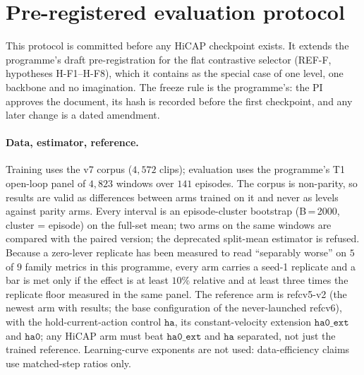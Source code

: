 \section{Pre-registered evaluation protocol}\label{sec:protocol}
This protocol is committed before any HiCAP checkpoint exists. It extends the programme's draft pre-registration for the flat contrastive selector (REF-F, hypotheses H-F1--H-F8), which it contains as
the special case of one level, one backbone and no imagination. The freeze rule is the programme's: the PI approves the document, its hash is recorded before the first checkpoint, and any later change is a dated amendment.

\paragraph{Data, estimator, reference.}
Training uses the v7 corpus ($4{,}572$ clips); evaluation uses the programme's T1 open-loop panel of $4{,}823$ windows over $141$ episodes. The corpus is non-parity, so results are valid as differences between arms trained on it and never as levels against parity arms.
Every interval is an episode-cluster bootstrap (B\,=\,2000, cluster = episode) on the full-set mean; two arms on the same windows are compared with the paired version; the deprecated split-mean estimator is refused. Because a zero-lever replicate has been measured to read ``separably worse'' on $5$ of $9$ family metrics in this programme\evI, every arm carries a seed-1 replicate and a bar is met only if the effect is at least $10\%$ relative and at least three times the replicate floor measured in the same panel.
The reference arm is refcv5-v2 (the newest arm with results; the base configuration of the never-launched refcv6), with the hold-current-action control $\texttt{ha}$, its constant-velocity extension $\texttt{ha0\_ext}$ and $\texttt{ha0}$; any HiCAP arm must beat $\texttt{ha0\_ext}$ and $\texttt{ha}$ separated, not just the trained reference.
Learning-curve exponents are not used: data-efficiency claims use matched-step ratios only.

